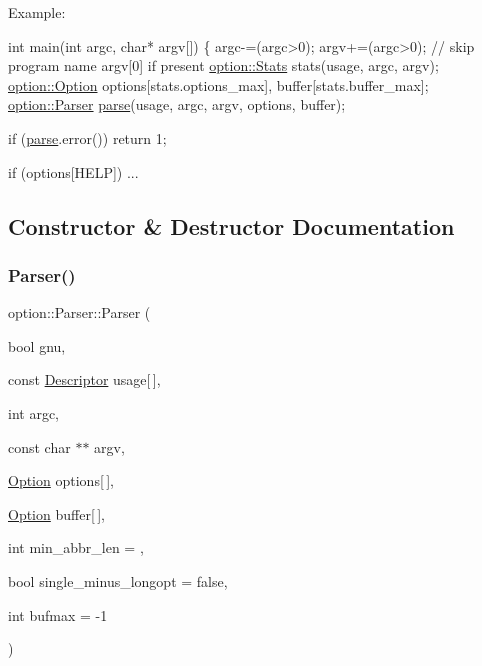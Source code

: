 \begin{DoxyParagraph}{Example\+:}

\begin{DoxyCode}
\textcolor{keywordtype}{int} main(\textcolor{keywordtype}{int} argc, \textcolor{keywordtype}{char}* argv[])
\{
  argc-=(argc>0); argv+=(argc>0); \textcolor{comment}{// skip program name argv[0] if present}
  \hyperlink{structoption_1_1Stats}{option::Stats}  stats(usage, argc, argv);
  \hyperlink{classoption_1_1Option}{option::Option} options[stats.options\_max], buffer[stats.buffer\_max];
  \hyperlink{classoption_1_1Parser}{option::Parser} \hyperlink{classoption_1_1Parser_a6e0b5778d1cfbd6cd51240e74d01e138}{parse}(usage, argc, argv, options, buffer);

  \textcolor{keywordflow}{if} (\hyperlink{classoption_1_1Parser_a6e0b5778d1cfbd6cd51240e74d01e138}{parse}.error())
    \textcolor{keywordflow}{return} 1;

  \textcolor{keywordflow}{if} (options[HELP])
  ...
\end{DoxyCode}
 
\end{DoxyParagraph}


\subsection{Constructor \& Destructor Documentation}
\mbox{\label{classoption_1_1Parser_aa747e9792c9c08ede32b6c323438db71}} 
\subsubsection{\texorpdfstring{Parser()}{Parser()}}
{\footnotesize\ttfamily option\+::\+Parser\+::\+Parser (\begin{DoxyParamCaption}\item[{bool}]{gnu,  }\item[{const \hyperlink{structoption_1_1Descriptor}{Descriptor}}]{usage\mbox{[}$\,$\mbox{]},  }\item[{int}]{argc,  }\item[{const char $\ast$$\ast$}]{argv,  }\item[{\hyperlink{classoption_1_1Option}{Option}}]{options\mbox{[}$\,$\mbox{]},  }\item[{\hyperlink{classoption_1_1Option}{Option}}]{buffer\mbox{[}$\,$\mbox{]},  }\item[{int}]{min\+\_\+abbr\+\_\+len = {},  }\item[{bool}]{single\+\_\+minus\+\_\+longopt = {\ttfamily false},  }\item[{int}]{bufmax = {\ttfamily -\/1} }\end{DoxyParamCaption})\hspace{0.3cm}{\ttfamily [inline]}}



